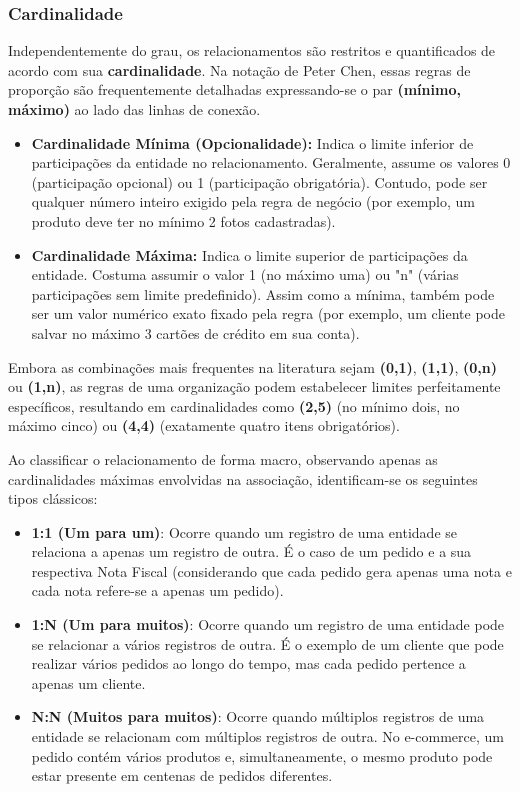 \subsubsection{Cardinalidade}

Independentemente do grau, os relacionamentos são restritos e quantificados de acordo com sua \textbf{cardinalidade}. Na notação de Peter Chen, essas regras de proporção são frequentemente detalhadas expressando-se o par \textbf{(mínimo, máximo)} ao lado das linhas de conexão.

\begin{itemize}
    \item \textbf{Cardinalidade Mínima (Opcionalidade):} Indica o limite inferior de participações da entidade no relacionamento. Geralmente, assume os valores 0 (participação opcional) ou 1 (participação obrigatória). Contudo, pode ser qualquer número inteiro exigido pela regra de negócio (por exemplo, um produto deve ter no mínimo 2 fotos cadastradas).
    \item \textbf{Cardinalidade Máxima:} Indica o limite superior de participações da entidade. Costuma assumir o valor 1 (no máximo uma) ou "n" (várias participações sem limite predefinido). Assim como a mínima, também pode ser um valor numérico exato fixado pela regra (por exemplo, um cliente pode salvar no máximo 3 cartões de crédito em sua conta).
\end{itemize}

Embora as combinações mais frequentes na literatura sejam \textbf{(0,1)}, \textbf{(1,1)}, \textbf{(0,n)} ou \textbf{(1,n)}, as regras de uma organização podem estabelecer limites perfeitamente específicos, resultando em cardinalidades como \textbf{(2,5)} (no mínimo dois, no máximo cinco) ou \textbf{(4,4)} (exatamente quatro itens obrigatórios).

Ao classificar o relacionamento de forma macro, observando apenas as cardinalidades máximas envolvidas na associação, identificam-se os seguintes tipos clássicos:

\begin{itemize}
    \item \textbf{1:1 (Um para um)}: Ocorre quando um registro de uma entidade se relaciona a apenas um registro de outra. É o caso de um pedido e a sua respectiva Nota Fiscal (considerando que cada pedido gera apenas uma nota e cada nota refere-se a apenas um pedido).
    \item \textbf{1:N (Um para muitos)}: Ocorre quando um registro de uma entidade pode se relacionar a vários registros de outra. É o exemplo de um cliente que pode realizar vários pedidos ao longo do tempo, mas cada pedido pertence a apenas um cliente.
    \item \textbf{N:N (Muitos para muitos)}: Ocorre quando múltiplos registros de uma entidade se relacionam com múltiplos registros de outra. No e-commerce, um pedido contém vários produtos e, simultaneamente, o mesmo produto pode estar presente em centenas de pedidos diferentes.
\end{itemize}

